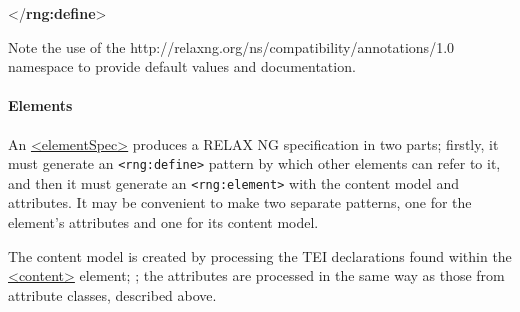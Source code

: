 \begin{shaded}
\hspace*{1em}\hspace*{1em}\hspace*{1em}\mbox{}\newline 
\hspace*{1em}\hspace*{1em}\mbox{}\newline 
\hspace*{1em}\mbox{}\newline 
{}\mbox{}\newline 
{</\textbf{rng:define}>}\end{shaded}\egroup\par \noindent  Note the use of the \textsf{http://relaxng.org/ns/compatibility/annotations/1.0} namespace to provide default values and documentation.
\paragraph[{Elements}]{Elements}\label{IMEL}\par
An \hyperref[TEI.elementSpec]{<elementSpec>} produces a RELAX NG specification in two parts; firstly, it must generate an \texttt{<rng:define>} pattern by which other elements can refer to it, and then it must generate an \texttt{<rng:element>} with the content model and attributes. It may be convenient to make two separate patterns, one for the element's attributes and one for its content model.\par
The content model is created by processing the TEI declarations found within the \hyperref[TEI.content]{<content>} element; ; the attributes are processed in the same way as those from attribute classes, described above.
